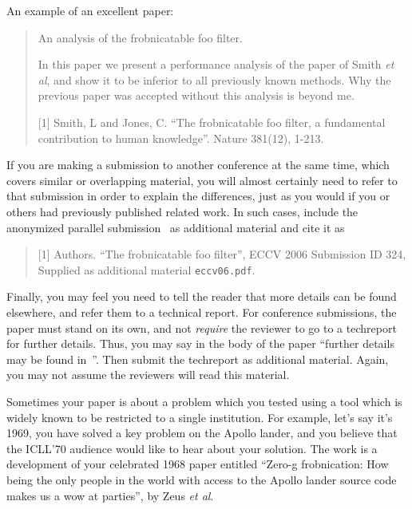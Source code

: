 \documentclass{bmvc2k}
\def\etal{\emph{et al}\bmvaOneDot}
\begin{document}
An example of an excellent paper:

\begin{quote}
\begin{center}
     An analysis of the frobnicatable foo filter.
\end{center}

   In this paper we present a performance analysis of the
   paper of Smith \etal [1], and show it to be inferior to
   all previously known methods.  Why the previous paper
   was accepted without this analysis is beyond me.

   [1] Smith, L and Jones, C. ``The frobnicatable foo
   filter, a fundamental contribution to human knowledge''.
   Nature 381(12), 1-213.
\end{quote}

If you are making a submission to another conference at the same time,
which covers similar or overlapping material, you will almost certainly
need to refer to that submission in order to explain the differences,
just as you would if you or others had previously published related
work.  In such cases, include the anonymized parallel
submission~\cite{Authors06} as additional material and cite it as
\begin{quote}
[1] Authors. ``The frobnicatable foo filter'', ECCV 2006 Submission ID 324,
Supplied as additional material {\tt eccv06.pdf}.
\end{quote}

Finally, you may feel you need to tell the reader that more details can be
found elsewhere, and refer them to a technical report.  For conference
submissions, the paper must stand on its own, and not {\em require} the
reviewer to go to a techreport for further details.  Thus, you may say in
the body of the paper ``further details may be found
in~\cite{Authors06b}''.  Then submit the techreport as additional material.
Again, you may not assume the reviewers will read this material.

Sometimes your paper is about a problem which you tested using a tool which
is widely known to be restricted to a single institution.  For example,
let's say it's 1969, you have solved a key problem on the Apollo lander,
and you believe that the ICLL'70 audience would like to hear about your
solution.  The work is a development of your celebrated 1968 paper entitled
``Zero-g frobnication: How being the only people in the world with access to
the Apollo lander source code makes us a wow at parties'', by Zeus \etal.
\end{document}
